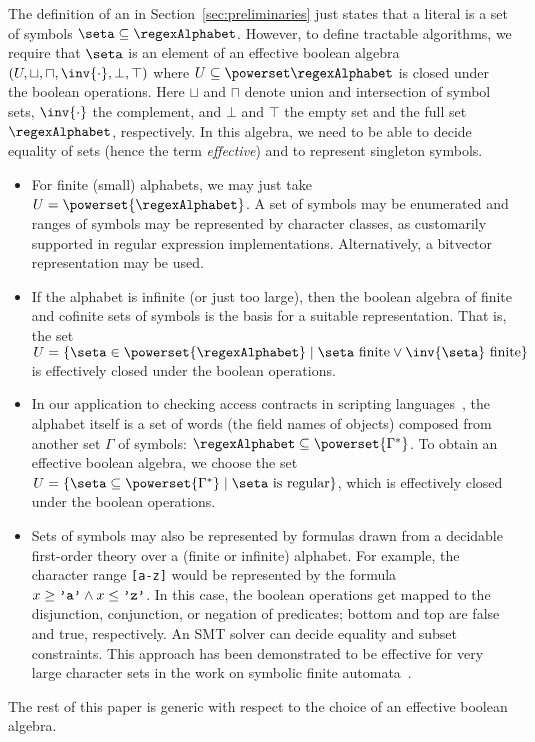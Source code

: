 The definition of an \ERE{} in Section~\ref{sec:preliminaries} just
states that a literal is a set of symbols
\mbox{$\seta\subseteq\regexAlphabet$}. However, to define tractable
algorithms, we require that $\seta$ is an element of an
effective boolean algebra \cite{Veanes2013} $(U, \sqcup,
\sqcap, \inv{\cdot}, \bot, \top)$ where $U \subseteq
\powerset\regexAlphabet$ is closed under the boolean operations. Here
$\sqcup$ and $\sqcap$ denote 
union and intersection of symbol sets, $\inv{\cdot}$ the complement,
and $\bot$ and $\top$ the empty set and the full set $\regexAlphabet$,
respectively. In this algebra, we need to be able to decide
equality of sets (hence the term \emph{effective}) and to represent
singleton symbols. 
\begin{itemize}
  \item For finite (small) alphabets, we may just take $U =
    \powerset{\regexAlphabet}$. A set of symbols may be enumerated
    and ranges of symbols may be represented by character classes, as
    customarily supported in regular expression
    implementations. Alternatively, a bitvector representation may be used.
  \item 
    If the alphabet is infinite (or just too large), then the boolean
    algebra of finite and cofinite sets of symbols is the basis for a
    suitable representation. That is, the set $U = \{\seta\in\powerset{\regexAlphabet}
    \mid \seta \text{ finite} \vee \inv{\seta}
    \text{ finite} \}$ is effectively closed under the boolean operations.
  \item
    In our application to checking access contracts in scripting
    languages~\cite{KeilThiemann2013-Proxy}, the alphabet itself is a set of words (the field names of
    objects) composed from another set $\Gamma$ of symbols:
    $\regexAlphabet \subseteq \powerset{\Gamma^*}$. To obtain an
    effective boolean algebra, we choose the set $U = \{ \seta \subseteq \powerset{\Gamma^*} \mid \seta \text{ is regular}\}$,
    which is effectively closed under the boolean operations.
  \item
    Sets of symbols may also be represented by formulas drawn from a
    decidable first-order theory over a (finite or infinite) alphabet.
    For example, the character range
    \texttt{[a-z]} would be represented by the formula $x\ge\verb|'a'|
    \wedge x\le\verb|'z'|$. 
    In this case, the boolean operations get mapped to the disjunction,
    conjunction, or negation of predicates; bottom and top are false and true,
    respectively. An SMT solver can decide equality and subset constraints.
    This approach has been demonstrated to be
    effective for very large character sets in the work on symbolic finite
    automata~\cite{Veanes2013}.
\end{itemize}
The rest of this paper is generic with respect to the choice
of an effective boolean algebra. 



